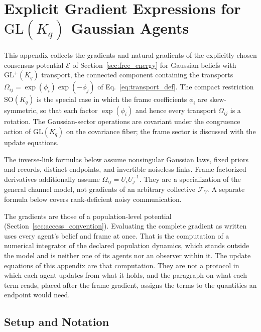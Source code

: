 \section{\texorpdfstring{Explicit Gradient Expressions for $\mathrm{GL}(K_q)$ Gaussian Agents}{Explicit Gradient Expressions for GL(Kq) Gaussian Agents}}\label{app:gradients}

This appendix collects the gradients and natural gradients of the explicitly chosen consensus potential $\mathcal{E}$ of Section~\ref{sec:free_energy} for Gaussian beliefs with $\mathrm{GL}^+(K_q)$ transport, the connected component containing the transports $\Omega_{ij} = \exp(\phi_i)\exp(-\phi_j)$ of Eq.~\eqref{eq:transport_def}. The compact restriction $\mathrm{SO}(K_q)$ is the special case in which the frame coefficients $\phi_i$ are skew-symmetric, so that each factor $\exp(\phi_i)$ and hence every transport $\Omega_{ij}$ is a rotation. The Gaussian-sector operations are covariant under the congruence action of $\mathrm{GL}(K_q)$ on the covariance fiber; the frame sector is discussed with the update equations.

The inverse-link formulas below assume nonsingular Gaussian laws, fixed priors and records, distinct endpoints, and invertible noiseless links. Frame-factorized derivatives additionally assume $\Omega_{ij}=U_iU_j^{-1}$. They are a specialization of the general channel model, not gradients of an arbitrary collective $\mathcal F_V$. A separate formula below covers rank-deficient noisy communication.

The gradients are those of a population-level potential (Section~\ref{sec:access_convention}). Evaluating the complete gradient as written uses every agent's belief and frame at once. That is the computation of a numerical integrator of the declared population dynamics, which stands outside the model and is neither one of its agents nor an observer within it. The update equations of this appendix are that computation. They are not a protocol in which each agent updates from what it holds, and the paragraph on what each term reads, placed after the frame gradient, assigns the terms to the quantities an endpoint would need.

\subsection*{Setup and Notation}

